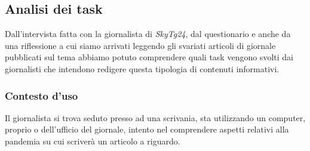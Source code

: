 \subsection{Analisi dei task}
\label{ss:analisi-task}
Dall'intervista fatta con la giornalista di \textit{SkyTg24}, dal questionario e anche da una riflessione a cui siamo arrivati leggendo gli svariati articoli di giornale pubblicati sul tema abbiamo potuto comprendere quali task vengono svolti dai giornalisti che intendono redigere questa tipologia di contenuti informativi.

\subsubsection{Contesto d'uso}
\label{sss:contesto-uso}
Il giornalista si trova seduto presso ad una scrivania, sta utilizzando un computer, proprio o dell'ufficio del giornale, intento nel comprendere aspetti relativi alla pandemia su cui scriverà un articolo a riguardo.


